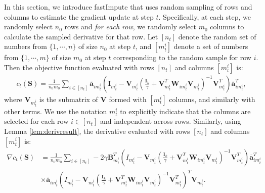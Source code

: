 \documentclass[twoside,11pt]{article}
\begin{document}
In this section, we introduce fastImpute that uses random sampling of rows and columns to estimate the gradient update at step $t$. Specifically, at each step, we randomly select $n_0$ rows and \emph{for each row}, we randomly select $m_0$ columns to calculate the sampled derivative for that row. Let $[n_t]$ denote the random set of numbers from $\{1,\cdots,n\}$ of size $n_0$ at step $t$, and $[m_t^i]$ denote a set of numbers from $\{1,\cdots,m\}$ of size $m_0$ at step $t$ corresponding to the random sample for row $i$. Then the objective function evaluated  with rows $[n_t]$ and columns $[m_t^i]$ is:
\begin{align*}
	c_{t}(\bm{S})=\frac{1}{n_0m_0} \sum_{i \in [n_t]} \overline{\bm{a}}_{im_t^i} 
	\left(\bm{I}_{m_t^i}-\bm{V}_{m_t^i}\left(\frac{\bm{I}_k}{\gamma}+\bm{V}_{m_t^i}^T\bm{W}_{im_t^i}\bm{V}_{m_t^i}\right)^{-1}\bm{V}_{m_t^i}^T\right)\overline{\bm{a}}_{im_t^i}^T,
\end{align*}
where $\bm{V}_{m_t^i}$ is the submatrix of $\bm{V}$ formed with $[m_t^i]$ columns, and similarly with other terms. We use the notation $m_t^i$ to explicitly indicate that the columns are selected for each row $i \in [n_t]$ and independent across rows.  
Similarly, using Lemma \ref{lem:derivresult}, the derivative evaluated with rows $[n_t]$ and columns $[m_t^i]$ is:
\begin{align*}
	\nabla c_{t}(\bm{S})&=\frac{1}{n_0m_0} \sum_{i \in [n_t]} -2 \gamma \bm{B}_{m_t^i}^T\left(I_{m_t^i}-\bm{V}_{m_t^i}\left(\frac{\bm{I}_k}{\gamma}+\bm{V}_{m_t^i}^T\bm{W}_{im_t^i}\bm{V}_{m_t^i}\right)^{-1}\bm{V}_{m_t^i}^T\right)\overline{\bm{a}}_{im_t^i}^T\\&\times\overline{\bm{a}}_{im_t^i}\left(I_{m_t^i}-\bm{V}_{m_t^i}\left(\frac{\bm{I}_k}{\gamma}+\bm{V}_{m_t^i}^T\bm{W}_{im_t^i}\bm{V}_{m_t^i}\right)^{-1}\bm{V}_{m_t^i}^T\right)^T\bm{V}_{m_t^i}.
\end{align*}
\end{document}
